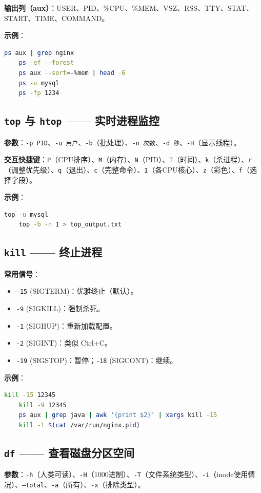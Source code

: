 \textbf{输出列（aux）}：USER、PID、\%CPU、\%MEM、VSZ、RSS、TTY、STAT、START、TIME、COMMAND。

\textbf{示例}：
\begin{lstlisting}[language=bash]
	ps aux | grep nginx
	ps -ef --forest
	ps aux --sort=-%mem | head -6
	ps -u mysql
	ps -fp 1234
\end{lstlisting}

\subsection{\texttt{top} 与 \texttt{htop} —— 实时进程监控} \textbf{参数}：\texttt{-p PID}、\texttt{-u 用户}、\texttt{-b}（批处理）、\texttt{-n 次数}、\texttt{-d 秒}、\texttt{-H}（显示线程）。

\textbf{交互快捷键}：\texttt{P}（CPU排序）、\texttt{M}（内存）、\texttt{N}（PID）、\texttt{T}（时间）、\texttt{k}（杀进程）、\texttt{r}（调整优先级）、\texttt{q}（退出）、\texttt{c}（完整命令）、\texttt{1}（各CPU核心）、\texttt{z}（彩色）、\texttt{f}（选择字段）。

\textbf{示例}：
\begin{lstlisting}[language=bash]
	top -u mysql
	top -b -n 1 > top_output.txt
\end{lstlisting}

\subsection{\texttt{kill} —— 终止进程} \textbf{常用信号}：
\begin{itemize}
\item \texttt{-15} (SIGTERM)：优雅终止（默认）。
\item \texttt{-9} (SIGKILL)：强制杀死。
\item \texttt{-1} (SIGHUP)：重新加载配置。
\item \texttt{-2} (SIGINT)：类似 Ctrl+C。
\item \texttt{-19} (SIGSTOP)：暂停；\texttt{-18} (SIGCONT)：继续。
\end{itemize}

\textbf{示例}：
\begin{lstlisting}[language=bash]
	kill -15 12345
	kill -9 12345
	ps aux | grep java | awk '{print $2}' | xargs kill -15
	kill -1 $(cat /var/run/nginx.pid)
\end{lstlisting}

\subsection{\texttt{df} —— 查看磁盘分区空间} \textbf{参数}：\texttt{-h}（人类可读）、\texttt{-H}（1000进制）、\texttt{-T}（文件系统类型）、\texttt{-i}（inode使用情况）、\texttt{--total}、\texttt{-a}（所有）、\texttt{-x}（排除类型）。

